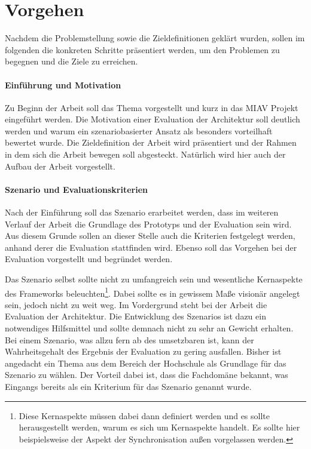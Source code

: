 \documentclass[12pt,headsepline,a4paper,bibtotoc,liststotoc,DIV12,BCOR12mm]{scrartcl}
\begin{document}

\section{Vorgehen} %
\label{sec:vorgehen}

  Nachdem die Problemstellung sowie die Zieldefinitionen geklärt wurden, sollen im folgenden die konkreten Schritte präsentiert werden, um den Problemen zu begegnen und die Ziele zu erreichen.

\paragraph{Einführung und Motivation} %
\label{par:einfuehrung}
  
  Zu Beginn der Arbeit soll das Thema vorgestellt und kurz in das MIAV Projekt eingeführt werden. Die Motivation einer Evaluation der Architektur soll deutlich werden und warum ein szenariobasierter Ansatz als besonders vorteilhaft bewertet wurde. Die Zieldefinition der Arbeit wird präsentiert und der Rahmen in dem sich die Arbeit bewegen soll abgesteckt. Natürlich wird hier auch der Aufbau der Arbeit vorgestellt.
  

\paragraph{Szenario und Evaluationskriterien} %
\label{par:szenario_und_evaluationskriterien}

  Nach der Einführung soll das Szenario erarbeitet werden, dass im weiteren Verlauf der Arbeit die Grundlage des Prototyps und der Evaluation sein wird. Aus diesem Grunde sollen an dieser Stelle auch die Kriterien festgelegt werden, anhand derer die Evaluation stattfinden wird. Ebenso soll das Vorgehen bei der Evaluation vorgestellt und begründet werden.
  
  Das Szenario selbst sollte nicht zu umfangreich sein und wesentliche Kernaspekte des Frameworks beleuchten\footnote{Diese Kernaspekte müssen dabei dann definiert werden und es sollte herausgestellt werden, warum es sich um Kernaspekte handelt. Es sollte hier beispielsweise der Aspekt der Synchronisation außen vorgelassen werden.}. Dabei sollte es in gewissem Maße visionär angelegt sein, jedoch nicht zu weit weg. Im Vordergrund steht bei der Arbeit die Evaluation der Architektur. Die Entwicklung des Szenarios ist dazu ein notwendiges Hilfsmittel und sollte demnach nicht zu sehr an Gewicht erhalten. Bei einem Szenario, was allzu fern ab des umsetzbaren ist, kann der Wahrheitsgehalt des Ergebnis der Evaluation zu gering ausfallen. Bisher ist angedacht ein Thema aus dem Bereich der Hochschule als Grundlage für das Szenario zu wählen. Der Vorteil dabei ist, dass die Fachdomäne bekannt, was Eingangs bereits als ein Kriterium für das Szenario genannt wurde.
  
\end{document}
